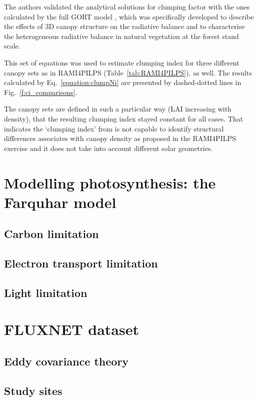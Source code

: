 The authors validated the analytical solutions for clumping factor with the ones calculated by the full GORT model \citep{Li1995}, which was specifically developed to describe the effects of 3D canopy structure on the radiative balance and to characterise the heterogeneous radiative balance in natural vegetation at the forest stand scale. 

This set of equations was used to estimate clumping index for three different canopy sets as in RAMI4PILPS (Table~\ref{tab:RAMI4PILPS}), as well. The results calculated by Eq.~\ref{equation:clumpNi} are presented by dashed-dotted lines in Fig.~\ref{f:ci_comparisons}. 

The canopy sets are defined in such a particular way (LAI increasing with density), that the resulting clumping index stayed constant for all cases. That indicates the `clumping index' from \citet{Ni-Meister2010} is not capable to identify structural differences associates with canopy density as proposed in the RAMI4PILPS exercise and it does not take into account different solar geometries.

\section{Modelling photosynthesis: the Farquhar model}

\subsection{Carbon limitation}

\subsection{Electron transport limitation}

\subsection{Light limitation}

\section{FLUXNET dataset}

\subsection{Eddy covariance theory}

\subsection{Study sites}

